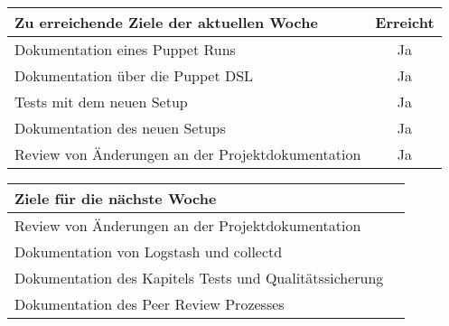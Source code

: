 \begin{tabularx}{\textwidth}{Xc}
    \arrayrulecolor{OliveGreen}
    \toprule
    {\bfseries Zu erreichende Ziele der aktuellen Woche} & {\bfseries Erreicht} \\
    \midrule[2pt]
    Dokumentation eines Puppet Runs                      &Ja                    \\
    \rowcolor{OliveGreen!15}
    Dokumentation über die Puppet DSL                    &Ja                    \\
    \rowcolor{White}
    Tests mit dem neuen Setup                            &Ja                    \\
    \rowcolor{OliveGreen!15}
    Dokumentation des neuen Setups                       &Ja                    \\
    \rowcolor{White}
    Review von Änderungen an der Projektdokumentation   &Ja                     \\
    \bottomrule[2pt]
\end{tabularx}
%
\vspace{1cm}
%
\begin{tabularx}{\textwidth}{Xc}
    \arrayrulecolor{OliveGreen}
    \toprule
    {\bfseries Ziele für die nächste Woche}              &                      \\
    \midrule[2pt]
    Review von Änderungen an der Projektdokumentation    &                      \\
    \rowcolor{OliveGreen!15}
    Dokumentation von Logstash und collectd              &                      \\
    \rowcolor{White}
    Dokumentation des Kapitels Tests und Qualitätssicherung &                   \\
    \rowcolor{OliveGreen!15}
    Dokumentation des Peer Review Prozesses             &                       \\
\end{tabularx}
